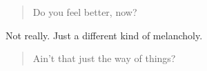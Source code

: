 \begin{quote}
Do you feel better, now?
\end{quote}

Not really. Just a different kind of melancholy.

\begin{quote}
Ain't that just the way of things?
\end{quote}
